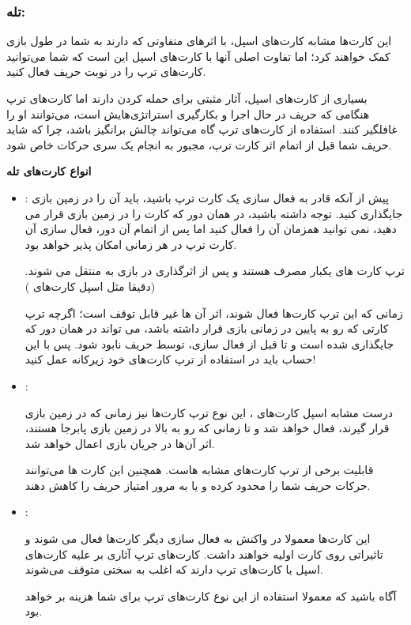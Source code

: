 \documentclass[]{article}
\begin{document}
\subsubsection*{{\titr تله:}}

این کارت‌ها مشابه کارت‌های اسپل، با اثر‌های متفاوتی که دارند به شما در طول بازی کمک خواهند کرد؛ اما تفاوت اصلی آنها با کارت‌های اسپل این است که شما می‌توانید کارت‌های ترپ را در نوبت حریف فعال کنید.

بسیاری از کارت‌های اسپل، آثار مثبتی برای حمله کردن دارند اما کارت‌های ترپ هنگامی که حریف در حال اجرا و بکارگیری استراتژی‌هایش است، می‌توانند او را غافلگیر کنند. استفاده از کارت‌های ترپ گاه می‌تواند چالش برانگیز باشد، چرا که شاید حریف شما قبل از اتمام اثر کارت ترپ، مجبور به انجام یک سری حرکات خاص شود.


\textbf{انواع کارت‌های تله}

\begin{itemize}
	\item {}:
پیش از آنکه قادر به فعال سازی یک کارت ترپ باشید، باید آن را در زمین بازی جایگذاری کنید. توجه داشته باشید، در همان دور که کارت را در زمین بازی قرار می دهید، نمی توانید همزمان آن را فعال کنید اما پس از اتمام آن دور، فعال سازی آن کارت ترپ در هر زمانی امکان پذیر خواهد بود.

ترپ کارت های  یکبار مصرف هستند و پس از اثرگذاری در بازی به  منتقل می شوند.(دقیقا مثل اسپل کارت‌های )

زمانی که این ترپ کارت‌ها فعال شوند، اثر آن ها غیر قابل توقف است؛ اگرچه ترپ کارتی که رو به پایین در زمانی بازی قرار داشته باشد، می تواند در همان دور که جایگذاری شده است و  تا قبل از فعال سازی، توسط حریف نابود شود. پس با این حساب باید در استفاده از ترپ کارت‌های خود زیرکانه عمل کنید!


	\item {}: 
	
درست مشابه اسپل کارت‌های ، این نوع ترپ کارت‌ها نیز زمانی که در زمین بازی قرار گیرند، فعال خواهد شد و تا زمانی که رو به بالا در زمین بازی پابرجا هستند، اثر آن‌ها در جریان بازی اعمال خواهد شد.

قابلیت برخی از ترپ کارت‌های   مشابه    هاست. همچنین این کارت ها می‌توانند حرکات حریف شما را محدود کرده و یا به مرور امتیاز حریف را کاهش دهند.

	
	\item {}:
	
این کارت‌ها معمولا در واکنش به فعال سازی دیگر کارت‌ها فعال می شوند و تاثیراتی روی کارت اولیه خواهند داشت.
کارت‌های ترپ  آثاری بر علیه کارت‌های اسپل    یا کارت‌های ترپ   دارند که اغلب به سختی متوقف می‌شوند.

آگاه باشید که معمولا استفاده از این نوع کارت‌های ترپ برای شما هزینه بر خواهد بود.
	
\end{itemize}
\end{document}
